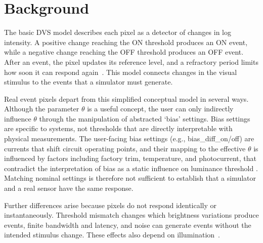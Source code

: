\section{Background}
\label{sec:background}


The basic DVS model describes each pixel as a detector of changes in log intensity. A positive change reaching the ON threshold produces an ON event, while a negative change reaching the OFF threshold produces an OFF event. After an event, the pixel updates its reference level, and a refractory period limits how soon it can respond again~\cite{lichtsteiner2008dvs,gallego2022event}. This model connects changes in the visual stimulus to the events that a simulator must generate.


Real event pixels depart from this simplified conceptual model in several ways. Although the parameter $\theta$ is a useful concept, the user can only indirectly influence $\theta$ through the manipulation of abstracted `bias' settings.  Bias settings are specific to systems, not thresholds that are directly interpretable with physical measurements. The user-facing bias settings (e.g., bias\_diff\_on/off) are currents that shift circuit operating points, and their mapping to the effective $\theta$ is influenced by factors including factory trim, temperature, and photocurrent, that contradict the interpretation of bias as a static influence on luminance threshold \cite{graca2023biasing}. Matching nominal settings is therefore not sufficient to establish that a simulator and a real sensor have the same response.



Further differences arise because pixels do not respond identically or instantaneously. Threshold mismatch changes which brightness variations produce events, finite bandwidth and latency, and noise can generate events without the intended stimulus change. These effects also depend on illumination~\cite{hu2021v2e,graca2021noise}. 

